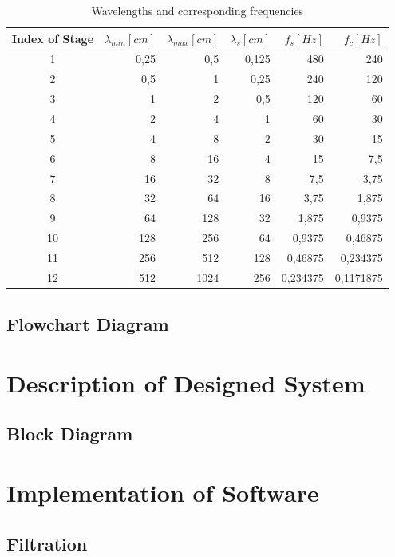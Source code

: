 \documentclass[twoside]{ctuthesis}
\theoremstyle{plain}
\theoremstyle{definition}
\theoremstyle{note}
\begin{document}
\begin{table}[htbp]
	\centering
	\caption{Wavelengths and corresponding frequencies}
	\begin{tabular}{crrrrr}
		\toprule
		Index of Stage & $\lambda_{min} [cm]$ & $\lambda_{max} [cm]$ & $\lambda_{s} [cm]$ & $f_s [Hz]$ & $f_c [Hz]$ \\
		\midrule
		1     & 0,25  & 0,5   & 0,125 & 480   & 240 \\
		2     & 0,5   & 1     & 0,25  & 240   & 120 \\
		3     & 1     & 2     & 0,5   & 120   & 60 \\
		4     & 2     & 4     & 1     & 60    & 30 \\
		5     & 4     & 8     & 2     & 30    & 15 \\
		6     & 8     & 16    & 4     & 15    & 7,5 \\
		7     & 16    & 32    & 8     & 7,5   & 3,75 \\
		8     & 32    & 64    & 16    & 3,75  & 1,875 \\
		9     & 64    & 128   & 32    & 1,875 & 0,9375 \\
		10    & 128   & 256   & 64    & 0,9375 & 0,46875 \\
		11    & 256   & 512   & 128   & 0,46875 & 0,234375 \\
		12    & 512   & 1024  & 256   & 0,234375 & 0,1171875 \\
		\bottomrule
	\end{tabular}%
	\label{tab:Wavelengths}%
\end{table}%


\subsection{Flowchart Diagram}
\section{Description of Designed System}
\subsection{Block Diagram}
\section{Implementation of Software}
\subsection{Filtration}
\end{document}
